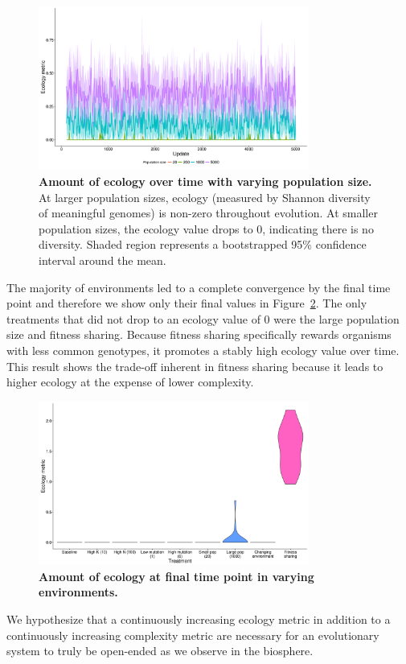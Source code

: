 \documentclass[letterpaper]{article}
\begin{document}
\begin{figure}
\includegraphics[width=3.5in]{figs/ecological_mean_ci_pop_size.png}
\caption{\textbf{Amount of ecology over time with varying population size.} At larger population sizes, ecology (measured by Shannon diversity of meaningful genomes) is non-zero throughout evolution. At smaller population sizes, the ecology value drops to 0, indicating there is no diversity. Shaded region represents a bootstrapped 95\% confidence interval around the mean.}
\label{ecological_time}
\end{figure}

The majority of environments led to a complete convergence by the final time point and therefore we show only their final values in Figure~\ref{ecology}. The only treatments that did not drop to an ecology value of 0 were the large population size and fitness sharing. Because fitness sharing specifically rewards organisms with less common genotypes, it promotes a stably high ecology value over time. This result shows the trade-off inherent in fitness sharing because it leads to higher ecology at the expense of lower complexity.

\begin{figure}
\includegraphics[width=3.5in]{figs/ecologyboxplots.png}
\caption{\textbf{Amount of ecology at final time point in varying environments.} }
\label{ecology}
\end{figure}

We hypothesize that a continuously increasing ecology metric in addition to a continuously increasing complexity metric are necessary for an evolutionary system to truly be open-ended as we observe in the biosphere.
\end{document}
